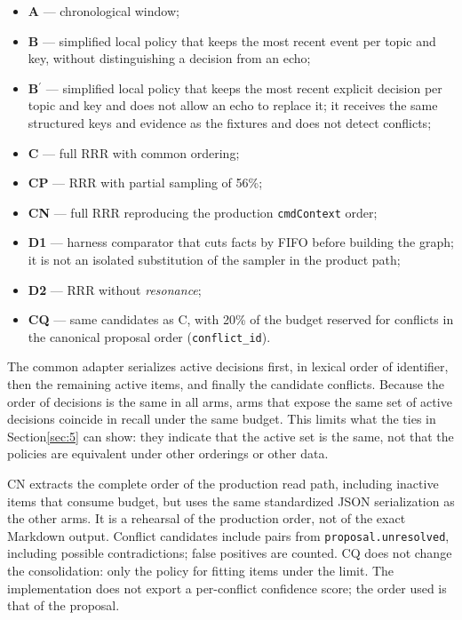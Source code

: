 \documentclass[11pt,a4paper]{article}
\begin{document}
\begin{itemize}\setlength{\itemsep}{1pt}
\item \textbf{A} --- chronological window;
\item \textbf{B} --- simplified local policy that keeps the most recent event per topic and key, without distinguishing a decision from an echo;
\item \textbf{B\ensuremath{^{\prime}}} --- simplified local policy that keeps the most recent explicit decision per topic and key and does not allow an echo to replace it; it receives the same structured keys and evidence as the fixtures and does not detect conflicts;
\item \textbf{C} --- full RRR with common ordering;
\item \textbf{CP} --- RRR with partial sampling of 56\%;
\item \textbf{CN} --- full RRR reproducing the production \texttt{cmdContext} order;
\item \textbf{D1} --- harness comparator that cuts facts by FIFO before building the graph; it is not an isolated substitution of the sampler in the product path;
\item \textbf{D2} --- RRR without \emph{resonance};
\item \textbf{CQ} --- same candidates as C, with 20\% of the budget reserved for conflicts in the canonical proposal order (\texttt{conflict\_id}).
\end{itemize}
The common adapter serializes active decisions first, in lexical order of identifier, then the remaining active items, and finally the candidate conflicts. Because the order of decisions is the same in all arms, arms that expose the same set of active decisions coincide in recall under the same budget. This limits what the ties in Section\nobreakspace{}\ref{sec:5} can show: they indicate that the active set is the same, not that the policies are equivalent under other orderings or other data.

CN extracts the complete order of the production read path, including inactive items that consume budget, but uses the same standardized JSON serialization as the other arms. It is a rehearsal of the production order, not of the exact Markdown output. Conflict candidates include pairs from \texttt{proposal.\allowbreak{}unresolved}, including possible contradictions; false positives are counted. CQ does not change the consolidation: only the policy for fitting items under the limit. The implementation does not export a per-conflict confidence score; the order used is that of the proposal.
\end{document}
